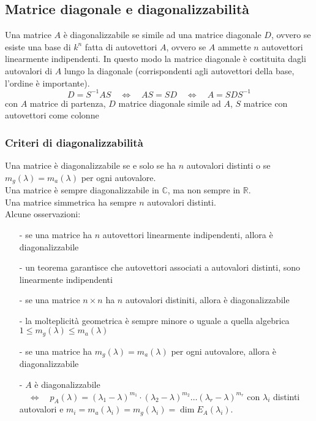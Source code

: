 \documentclass[a4paper]{article}
\begin{document}
\subsection{Matrice diagonale e diagonalizzabilità}
Una matrice \(A\) è diagonalizzabile se simile ad una matrice diagonale \(D\), ovvero se esiste una base di \(k^n\) fatta di
autovettori \(A\), ovvero se \(A\) ammette \(n\) autovettori linearmente indipendenti. In questo modo la matrice diagonale è
costituita dagli autovalori di \(A\) lungo la diagonale (corrispondenti agli autovettori della base, l'ordine è importante).
\[D = S^{-1} A S \quad \Leftrightarrow \quad AS = SD \quad \Leftrightarrow \quad A = S D S^{-1}\]
con \(A\) matrice di partenza, \(D\) matrice diagonale simile ad \(A\), \(S\) matrice con autovettori come colonne

\subsubsection*{Criteri di diagonalizzabilità}
Una matrice è diagonalizzabile se e solo se ha \(n\) autovalori distinti o se \(m_g(\lambda) = m_a(\lambda)\) per ogni autovalore. \\
Una matrice è sempre diagonalizzabile in \(\mathbb{C}\), ma non sempre in \(\mathbb{R}\). \\
Una matrice simmetrica ha sempre \(n\) autovalori distinti. \\
Alcune osservazioni:
\begin{itemize}[topsep=3pt, itemsep=0pt]
	\item[-] se una matrice ha \(n\) autovettori linearmente indipendenti, allora è diagonalizzabile
	\item[-] un teorema garantisce che autovettori associati a autovalori distinti, sono linearmente indipendenti
	\item[-] se una matrice \(n \times n\) ha \(n\) autovalori distiniti, allora è diagonalizzabile
	\item[-] la molteplicità geometrica è sempre minore o uguale a quella algebrica \(1 \leq m_g(\lambda) \leq m_a(\lambda)\)
	\item[-] se una matrice ha \(m_g(\lambda) = m_a(\lambda)\) per ogni autovalore, allora è diagonalizzabile
	\item[-] \(A\) è diagonalizzabile \(\quad \Leftrightarrow \quad p_A(\lambda) = (\lambda_1-\lambda)^{m_1} \cdot (\lambda_2-\lambda)^{m_2} \dots (\lambda_r-\lambda)^{m_r}\)
	con \(\lambda_i\) distinti autovalori e \(m_i = m_a(\lambda_i) = m_g(\lambda_i) = \dim E_A(\lambda_i)\).
\end{itemize}
\end{document}
